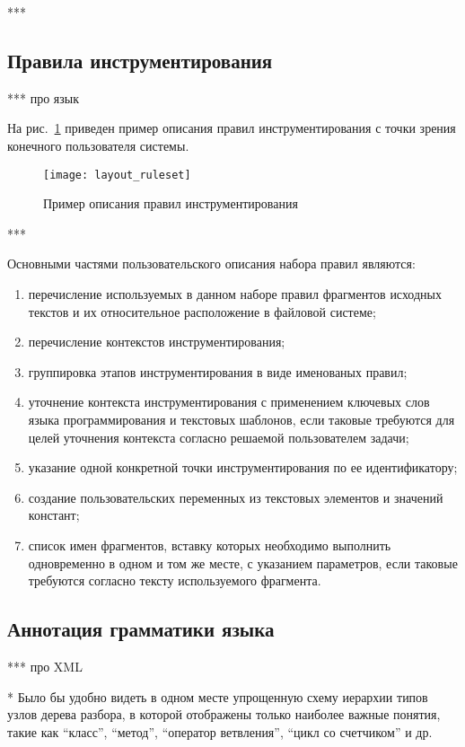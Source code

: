 ***

\subsection{Правила инструментирования}

***
про язык

На рис.~\ref{fig:layout_ruleset} приведен пример описания правил инструментирования с точки зрения конечного пользователя системы.

\begin{figure}[!h]
	\centering
	\texttt{[image: layout\_ruleset]}
	\caption{Пример описания правил инструментирования}
	\label{fig:layout_ruleset}
\end{figure}

***

Основными частями пользовательского описания набора правил являются:
\begin{enumerate}
  \item перечисление используемых в данном наборе правил фрагментов исходных текстов и их относительное расположение в файловой системе;
  \item перечисление контекстов инструментирования;
  \item группировка этапов инструментирования в виде именованых правил;
  \item уточнение контекста инструментирования с применением ключевых слов языка программирования и текстовых шаблонов, если таковые требуются для целей уточнения контекста согласно решаемой пользователем задачи;
  \item указание одной конкретной точки инструментирования по ее идентификатору;
  \item создание пользовательских переменных из текстовых элементов и значений констант;
  \item список имен фрагментов, вставку которых необходимо выполнить одновременно в одном и том же месте, с указанием параметров, если таковые требуются согласно тексту используемого фрагмента.
\end{enumerate}

\subsection{Аннотация грамматики языка}

***
про XML

* Было бы удобно видеть в одном месте упрощенную схему иерархии типов узлов дерева разбора, в которой отображены только наиболее важные понятия, такие как ``класс'', ``метод'', ``оператор ветвления'', ``цикл со счетчиком'' и др.

